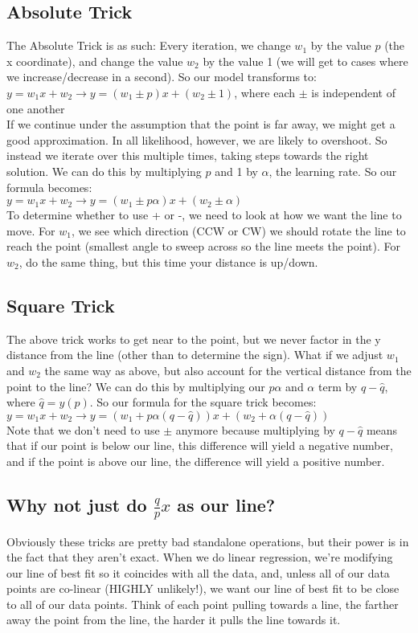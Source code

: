 \documentclass{article}
\begin{document}
\subsection{Absolute Trick}
The Absolute Trick is as such: Every iteration, we change $w_1$ by the value $p$ (the x coordinate), and change the value $w_2$ by the value 1 (we will get to cases where we increase/decrease in a second). So our model transforms to:\\
$y = w_1x+w_2 \rightarrow y = (w_1 \pm p)x+(w_2 \pm 1)$, where each $\pm$ is independent of one another\\
If we continue under the assumption that the point is far away, we might get a good approximation. In all likelihood, however, we are likely to overshoot. So instead we iterate over this multiple times, taking steps towards the right solution. We can do this by multiplying $p$ and 1 by $\alpha$, the learning rate. So our formula becomes:\\
$y = w_1x+w_2 \rightarrow y = (w_1 \pm p\alpha)x+(w_2 \pm \alpha)$\\
To determine whether to use + or -, we need to look at how we want the line to move. For $w_1$, we see which direction (CCW or CW) we should rotate the line to reach the point (smallest angle to sweep across so the line meets the point). For $w_2$, do the same thing, but this time your distance is up/down.
\subsection{Square Trick}
The above trick works to get near to the point, but we never factor in the y distance from the line (other than to determine the sign). What if we adjust $w_1$ and $w_2$ the same way as above, but also account for the vertical distance from the point to the line? We can do this by multiplying our $p\alpha$ and $\alpha$ term by $q-\hat{q}$, where $\hat{q} = y(p)$. So our formula for the square trick becomes:\\
$y = w_1x+w_2 \rightarrow y = (w_1 + p\alpha(q-\hat{q}))x+(w_2 + \alpha(q-\hat{q}))$\\
Note that we don't need to use $\pm$ anymore because multiplying by $q-\hat{q}$ means that if our point is below our line, this difference will yield a negative number,  and if the point is above our line, the difference will yield a positive number.
\subsection{Why not just do $\frac{q}{p}x$ as our line?}
Obviously these tricks are pretty bad standalone operations, but their power is in the fact that they aren't exact. When we do linear regression, we're modifying our line of best fit so it coincides with all the data, and, unless all of our data points are co-linear (HIGHLY unlikely!), we want our line of best fit to be close to all of our data points. Think of each point pulling towards a line, the farther away the point from the line, the harder it pulls the line towards it.
\end{document}

